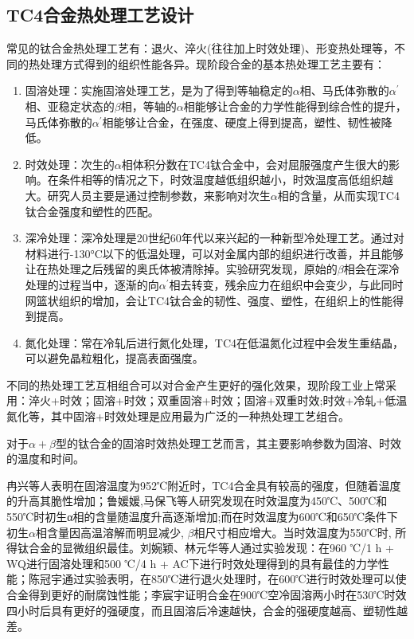 \subsection{TC4合金热处理工艺设计}
常见的\ti 钛合金热处理工艺有：退火、淬火(往往加上时效处理)、形变热处理等，不同的热处理方式得到的组织性能各异。现阶段\ti 合金的基本热处理工艺主要有：
\begin{enumerate}
	\item 固溶处理：实施固溶处理工艺，是为了得到等轴稳定的$\alpha $相、马氏体弥散的$ \alpha ^{\prime} $相、亚稳定状态的$\beta $相，等轴的$\alpha $相能够让合金的力学性能得到综合性的提升，马氏体弥散的$ \alpha ^{\prime} $相能够让合金，在强度、硬度上得到提高，塑性、韧性被降低\cite{gurong2002}。
	\item 时效处理：次生的$\alpha $相体积分数在TC4钛合金中，会对屈服强度产生很大的影响。在条件相等的情况之下，时效温度越低组织越小，时效温度高低组织越大。研究人员主要是通过控制参数，来影响对次生$\alpha $相的含量，从而实现TC4钛合金强度和塑性的匹配。
	\item 深冷处理：深冷处理是20世纪60年代以来兴起的一种新型冷处理工艺。通过对材料进行-130°C以下的低温处理，可以对金属内部的组织进行改善，并且能够让在热处理之后残留的奥氏体被清除掉。实验研究发现，原始的$\beta $相会在深冷处理的过程当中，逐渐的向$\alpha^{\prime} $相去转变，残余应力在组织中会变少，与此同时网篮状组织的增加，会让TC4钛合金的韧性、强度、塑性，在组织上的性能得到提高。
	\item 氮化处理：常在冷轧后进行氮化处理，TC4在低温氮化过程中会发生重结晶，可以避免晶粒粗化，提高表面强度\cite{guotanliuMicrostructureEvolutionTi2022}。
\end{enumerate}
不同的热处理工艺互相组合可以对合金产生更好的强化效果，现阶段工业上常采用\cite{zhoukaixiangJiyushenlengchulidenanjiagongcailiaoqiexiaotexingyanjiu2022}：淬火+时效；固溶+时效；双重固溶+时效；固溶+双重时效;时效+冷轧+低温氮化等，其中固溶+时效处理是应用最为广泛的一种热处理工艺组合。

对于$\alpha+\beta$型的\ti 钛合金的固溶时效热处理工艺而言，其主要影响参数为固溶、时效的温度和时间\cite{mirror1,ranxingGurongwenduduiTi6Al4VELItaihejinxianweizuzhijixingnengdeyingxiang2021}。


冉兴等人表明\cite{ranxingGurongwenduduiTi6Al4VELItaihejinxianweizuzhijixingnengdeyingxiang2021}在固溶温度为952℃附近时，TC4合金具有较高的强度，但随着温度的升高其脆性增加；鲁媛媛,马保飞等人研究发现在时效温度为450℃、500℃和550℃时初生α相的含量随温度升高逐渐增加;而在时效温度为600℃和650℃条件下初生$\alpha$相含量因高温溶解而明显减少, $\beta$相尺寸相应增大。当时效温度为550℃时, 所得钛合金的显微组织最佳\cite{luyuanyuanShixiaochuliduiTC4taihejinweiguanzuzhihelixuexingnengdeyingxiang2019}。刘婉颖、林元华等人通过实验发现：在960 ℃/1 h + WQ进行固溶处理和500 ℃/4 h + AC下进行时效处理得到的\ti 具有最佳的力学性能\cite{LiuWanYingBuTongReChuLiGongYiDuiTi6Al4VTaiHeJinWeiGuanJieGouHeLiXueXingNengYingXiangYingWen2017}；陈冠宇通过实验表明，在850℃进行退火处理时，在600℃进行时效处理可以使合金得到更好的耐腐蚀性能\cite{1200}；李宸宇证明\ti 合金在900℃空冷固溶两小时在530℃时效四小时后具有更好的强硬度，而且固溶后冷速越快，合金的强硬度越高、塑韧性越差\cite{900}。%


